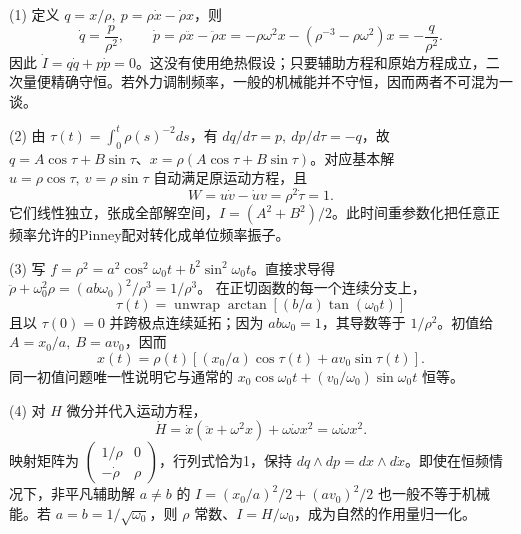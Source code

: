 (1) 定义 \(q=x/\rho,\ p=\rho\dot x-\dot\rho x\)，则
\[
\dot q=\frac p{\rho^2},\qquad
\dot p=\rho\ddot x-\ddot\rho x
=-\rho\omega^2x-(\rho^{-3}-\rho\omega^2)x=-\frac q{\rho^2}.
\]
因此 \(\dot I=q\dot q+p\dot p=0\)。这没有使用绝热假设；只要辅助方程和原始方程成立，二次量便精确守恒。若外力调制频率，一般的机械能并不守恒，因而两者不可混为一谈。

(2) 由 \(\tau(t)=\int_0^t\rho(s)^{-2}ds\)，有 \(dq/d\tau=p,\ dp/d\tau=-q\)，故
\(q=A\cos\tau+B\sin\tau\)、\(x=\rho(A\cos\tau+B\sin\tau)\)。对应基本解
\(u=\rho\cos\tau,\ v=\rho\sin\tau\) 自动满足原运动方程，且
\[
W=u\dot v-\dot uv=\rho^2\dot\tau=1.
\]
它们线性独立，张成全部解空间，\(I=(A^2+B^2)/2\)。此时间重参数化把任意正频率允许的Pinney配对转化成单位频率振子。

(3) 写 \(f=\rho^2=a^2\cos^2\omega_0t+b^2\sin^2\omega_0t\)。直接求导得
\(\ddot\rho+\omega_0^2\rho=(ab\omega_0)^2/\rho^3=1/\rho^3\)。
在正切函数的每一个连续分支上，
\[
\tau(t)=\operatorname{unwrap}\arctan[(b/a)\tan(\omega_0t)]
\]
且以 \(\tau(0)=0\) 并跨极点连续延拓；因为 \(ab\omega_0=1\)，其导数等于 \(1/\rho^2\)。初值给 \(A=x_0/a,\ B=av_0\)，因而
\[
x(t)=\rho(t)[(x_0/a)\cos\tau(t)+av_0\sin\tau(t)].
\]
同一初值问题唯一性说明它与通常的 \(x_0\cos\omega_0t+(v_0/\omega_0)\sin\omega_0t\) 恒等。

(4) 对 \(H\) 微分并代入运动方程，
\[
\dot H=\dot x(\ddot x+\omega^2x)+\omega\dot\omega x^2
=\omega\dot\omega x^2.
\]
映射矩阵为
\(\begin{pmatrix}1/\rho&0\\-\dot\rho&\rho\end{pmatrix}\)，行列式恰为1，保持 \(dq\wedge dp=dx\wedge d\dot x\)。即使在恒频情况下，非平凡辅助解 \(a\ne b\) 的 \(I=(x_0/a)^2/2+(av_0)^2/2\) 也一般不等于机械能。若 \(a=b=1/\sqrt{\omega_0}\)，则 \(\rho\) 常数、\(I=H/\omega_0\)，成为自然的作用量归一化。
